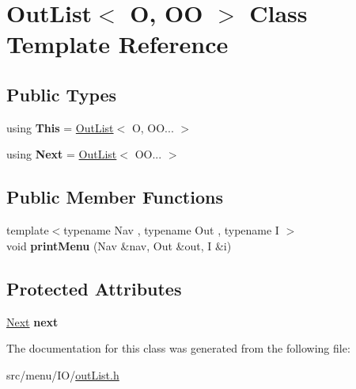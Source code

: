 \hypertarget{classOutList}{}\section{Out\+List$<$ O, OO $>$ Class Template Reference}
\label{classOutList}
\subsection*{Public Types}
\begin{DoxyCompactItemize}
\item 
\mbox{\label{classOutList_a2d2673aa6b42f90c3d9c355b169c3d07}} 
using {\bfseries This} = \hyperlink{classOutList}{Out\+List}$<$ O, O\+O... $>$
\item 
\mbox{\label{classOutList_a43d76f077a12b8b4375b2044cde570c9}} 
using {\bfseries Next} = \hyperlink{classOutList}{Out\+List}$<$ O\+O... $>$
\end{DoxyCompactItemize}
\subsection*{Public Member Functions}
\begin{DoxyCompactItemize}
\item 
\mbox{\label{classOutList_a545b6a67dfda40046004d50096215c2d}} 
{\footnotesize template$<$typename Nav , typename Out , typename I $>$ }\\void {\bfseries print\+Menu} (Nav \&nav, Out \&out, I \&i)
\end{DoxyCompactItemize}
\subsection*{Protected Attributes}
\begin{DoxyCompactItemize}
\item 
\mbox{\label{classOutList_ac43c0f0f67e2bf8549bfbea48bcfb3c7}} 
\hyperlink{classOutList}{Next} {\bfseries next}
\end{DoxyCompactItemize}


The documentation for this class was generated from the following file\+:\begin{DoxyCompactItemize}
\item 
src/menu/\+I\+O/\hyperlink{outList_8h}{out\+List.\+h}\end{DoxyCompactItemize}
